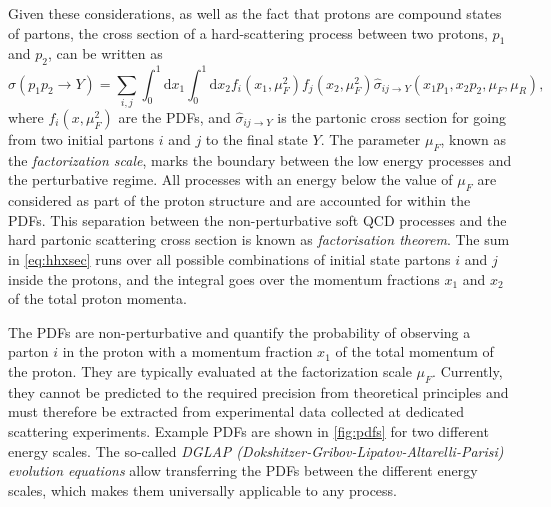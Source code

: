 Given these considerations, as well as the fact that protons are compound states of partons, the cross section of a hard-scattering process between two protons, $p_1$ and $p_2$, can be written as
\begin{equation}
  \sigma(p_1p_2 \to Y) = \sum_{i,j} \int_0^1 \mathrm{d}x_1 \int_0^1 \mathrm{d}x_2 f_i(x_1,\mu_F^2) f_j(x_2,\mu_F^2) \hat{\sigma}_{ij \rightarrow Y}(x_1p_1,x_2p_2,\mu_F,\mu_R), 
  \label{eq:hhxsec}
\end{equation}
where $f_i(x,\mu_F^2)$ are the PDFs, and $\hat{\sigma}_{ij \rightarrow Y}$ is the partonic cross section for going from two initial partons $i$ and $j$ to the final state $Y$.
The parameter $\mu_F$, known as the \emph{factorization scale}, marks the boundary between the low energy processes and the perturbative regime. 
All processes with an energy below the value of $\mu_F$ are considered as part of the proton structure and are accounted for within the PDFs. 
This separation between the non-perturbative soft QCD processes and the hard partonic scattering cross section is known as \emph{factorisation theorem}.
The sum in \cref{eq:hhxsec} runs over all possible combinations of initial state partons $i$ and $j$ inside the protons, and the integral goes over the momentum fractions $x_1$ and $x_2$ of the total proton momenta.

The PDFs are non-perturbative and quantify the probability of observing a parton $i$ in the proton with a momentum fraction $x_1$ of the total momentum of the proton.
They are typically evaluated at the factorization scale $\mu_F$. 
Currently, they cannot be predicted to the required precision from theoretical principles and must therefore be extracted from experimental data collected at dedicated scattering experiments.
Example PDFs are shown in \cref{fig:pdfs} for two different energy scales.
The so-called \emph{DGLAP (Dokshitzer-Gribov-Lipatov-Altarelli-Parisi) evolution equations} \cite{Dokshitzer:1977sg,GRIBOV197178,Altarelli:1977zs} allow transferring the PDFs between the different energy scales, which makes them universally applicable to any process. 

